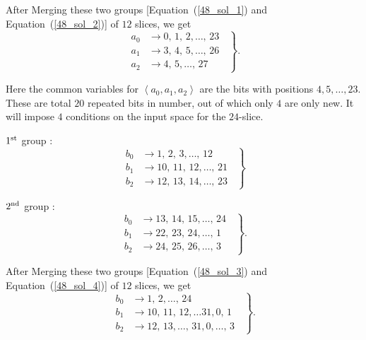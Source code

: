 After Merging these two groups [Equation~(\ref{48_sol_1}) and 
Equation~(\ref{48_sol_2})] of $12$ slices, we get
\begin{equation}
    \left.
    \begin{aligned}       
    a_0 &\rightarrow 0,\, 1,\, 2,\ldots ,\, 23\\
    a_1 & \rightarrow 3,\, 4,\, 5,\ldots ,\, 26\\
    a_2 & \rightarrow 4,\, 5,\ldots,\, 27
    \end{aligned}
    \;\;\right\}.
\end{equation}

Here the common variables for $\left< a_0, a_1,a_2\right>$ are the bits with positions
$4, 5,\ldots, 23$. These are total $20$ repeated bits in number, out of which only $4$ are only new. It will impose $4$ conditions on the input space for the $24$-slice.

$1^{\rm st}$ group :
\begin{equation}\label{48_sol_3}
    \left.
    \begin{aligned}
        b_0 &\rightarrow 1,\, 2,\, 3, \ldots ,\, 12\\
        b_1 &\rightarrow 10,\,11, \,12, \ldots ,\, 21\\
        b_2 &\rightarrow 12,\,13,\,14, \ldots ,\, 23
    \end{aligned}
    \;\;\right\}
\end{equation}

$2^{\rm nd}$ group :
\begin{equation}\label{48_sol_4}
    \left.
    \begin{aligned}    
      b_0 & \rightarrow 13,\, 14,\, 15, \ldots , \,24\\
      b_1 & \rightarrow 22,\, 23, \,24, \ldots , \,1\\
      b_2 & \rightarrow 24,\, 25,\,26, \ldots , \,3
    \end{aligned}
    \;\;\right\}.
\end{equation}

After Merging these two groups [Equation~(\ref{48_sol_3}) and 
Equation~(\ref{48_sol_4})] of $12$ slices, we get
\begin{equation}
    \left.
    \begin{aligned}       
    b_0 &\rightarrow 1,\, 2,\ldots ,\, 24\\
    b_1 & \rightarrow 10,\, 11,\, 12,\ldots 31, 0,\, 1\\
    b_2 & \rightarrow 12,\, 13,\ldots,\, 31, 0,  \ldots,\, 3
    \end{aligned}
    \;\;\right\}.
\end{equation}

